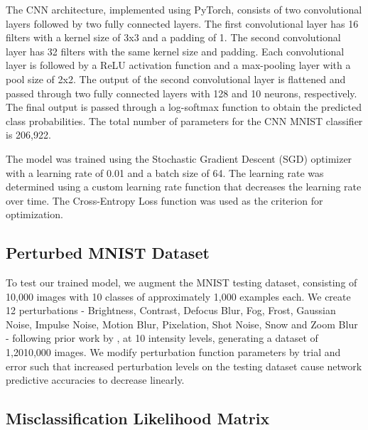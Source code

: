 The CNN architecture, implemented using PyTorch, consists of two convolutional layers followed by two fully connected layers. The first convolutional layer has 16 filters with a kernel size of 3x3 and a padding of 1. The second convolutional layer has 32 filters with the same kernel size and padding. Each convolutional layer is followed by a ReLU activation function and a max-pooling layer with a pool size of 2x2. The output of the second convolutional layer is flattened and passed through two fully connected layers with 128 and 10 neurons, respectively. The final output is passed through a log-softmax function to obtain the predicted class probabilities. The total number of parameters for the CNN MNIST classifier is 206,922.

The model was trained using the Stochastic Gradient Descent (SGD) optimizer with a learning rate of 0.01 and a batch size of 64. The learning rate was determined using a custom learning rate function that decreases the learning rate over time. The Cross-Entropy Loss function was used as the criterion for optimization. 


\subsection{Perturbed MNIST Dataset}
\label{methods:PerturbedMNISTDataset}

To test our trained model, we augment the MNIST testing dataset, consisting of 10,000 images with 10 classes of approximately 1,000 examples each. We create 12 perturbations - Brightness, Contrast, Defocus Blur, Fog, Frost, Gaussian Noise, Impulse Noise, Motion Blur, Pixelation, Shot Noise, Snow and Zoom Blur - following prior work by \cite{hendrycks2019benchmarking}, at 10 intensity levels, generating a dataset of 1,2010,000 images. We modify perturbation function parameters by trial and error such that increased perturbation levels on the testing dataset cause network predictive accuracies to decrease linearly.


\subsection{Misclassification Likelihood Matrix}
\label{miss_class_matrix}

